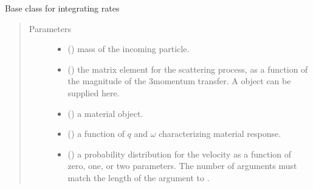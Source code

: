 \documentclass[letterpaper,10pt,english]{sphinxmanual}
\begin{document}
\begin{fulllineitems}
\label{\detokenize{code_structure:scdc.initial.distribution.integral.RateIntegrator}}
Base class for integrating rates
\begin{quote}\begin{description}
\item[{Parameters}] \leavevmode\begin{itemize}
\item {} 
 () \textendash{} mass of the incoming particle.

\item {} 
 () \textendash{} the matrix element for the scattering
process, as a function of the magnitude of the 3\sphinxhyphen{}momentum transfer.
A  object can be supplied here.

\item {} 
 () \textendash{} a material object.

\item {} 
 () \textendash{} a function of \(q\) and \(\omega\)
characterizing material response.

\item {} 
 () \textendash{} a probability distribution for the velocity as a
function of zero, one, or two parameters. The number of arguments
must match the length of the argument  to .

\end{itemize}

\end{description}\end{quote}


\end{fulllineitems}
\end{document}
